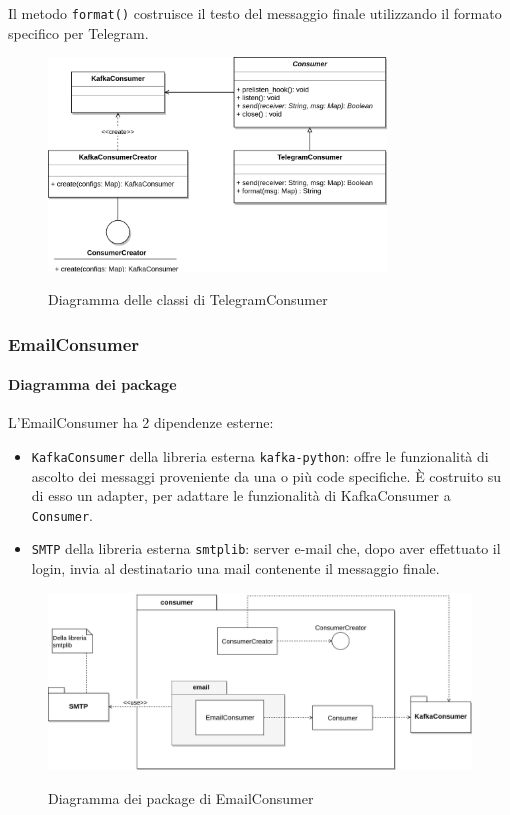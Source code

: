 Il metodo \texttt{format()} costruisce il testo del messaggio finale utilizzando il formato  specifico per Telegram.

\begin{figure}[H]
    \centering
    \includegraphics[width=0.8\textwidth]{img/Consumers-TelegramConsumer.png}\\
    \caption{Diagramma delle classi di TelegramConsumer}
\end{figure}


\subsubsection{EmailConsumer}

\paragraph{Diagramma dei package}

L'EmailConsumer ha 2 dipendenze esterne:
\begin{itemize}
    \item \texttt{KafkaConsumer} della libreria esterna \texttt{kafka-python}: offre le funzionalità di ascolto dei messaggi
        proveniente da una o più code specifiche. È costruito su di esso un adapter, per adattare le funzionalità di KafkaConsumer a
        \texttt{Consumer}.
    \item \texttt{SMTP} della libreria esterna \texttt{smtplib}: server e-mail che, dopo aver effettuato il login,
        invia al destinatario una mail contenente il messaggio finale.
\end{itemize}

\begin{figure}[H]
    \centering
    \includegraphics[width=\textwidth]{img/Package-EmailConsumer.png}\\
    \caption{Diagramma dei package di EmailConsumer}
\end{figure}



